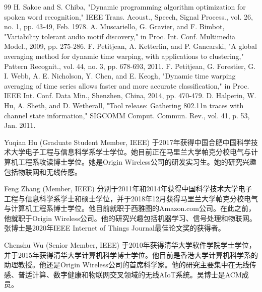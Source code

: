 \documentclass[journal]{IEEEtran}
\begin{document}
\begin{thebibliography}{99}
 H. Sakoe and S. Chiba, "Dynamic programming algorithm optimization for spoken word recognition," IEEE Trans. Acoust., Speech, Signal Process., vol. 26, no. 1, pp. 43-49, Feb. 1978.
 A. Muscariello, G. Gravier, and F. Bimbot, "Variability tolerant audio motif discovery," in Proc. Int. Conf. Multimedia Model., 2009, pp. 275-286.
 F. Petitjean, A. Ketterlin, and P. Gancarski, "A global averaging method for dynamic time warping, with applications to clustering," Pattern Recognit., vol. 44, no. 3, pp. 678-693, 2011.
 F. Petitjean, G. Forestier, G. I. Webb, A. E. Nicholson, Y. Chen, and E. Keogh, "Dynamic time warping averaging of time series allows faster and more accurate classification," in Proc. IEEE Int. Conf. Data Min., Shenzhen, China, 2014, pp. 470-479.
 D. Halperin, W. Hu, A. Sheth, and D. Wetherall, "Tool release: Gathering 802.11n traces with channel state information," SIGCOMM Comput. Commun. Rev., vol. 41, p. 53, Jan. 2011.
\end{thebibliography}

\begin{IEEEbiographynophoto}{Yuqian Hu} (Graduate Student Member, IEEE) 
于2017年获得中国合肥中国科学技术大学电子工程与信息科学系学士学位。她目前正在马里兰大学帕克分校电气与计算机工程系攻读博士学位。她是Origin Wireless公司的研发实习生。她的研究兴趣包括物联网和无线传感。
\end{IEEEbiographynophoto}

\begin{IEEEbiographynophoto}{Feng Zhang} (Member, IEEE) 
分别于2011年和2014年获得中国科学技术大学电子工程与信息科学系学士和硕士学位，并于2018年12月获得马里兰大学帕克分校电气与计算机工程系博士学位。他目前就职于西雅图的Amazon.com公司。在此之前，他就职于Origin Wireless公司。他的研究兴趣包括机器学习、信号处理和物联网。张博士是2020年IEEE Internet of Things Journal最佳论文奖的获得者。
\end{IEEEbiographynophoto}

\begin{IEEEbiographynophoto}{Chenshu Wu} (Senior Member, IEEE) 
于2010年获得清华大学软件学院学士学位，并于2015年获得清华大学计算机科学博士学位。他目前是香港大学计算机科学系的助理教授。他还是Origin Wireless公司的首席科学家。他的研究主要集中在无线传感、普适计算、数字健康和物联网交叉领域的无线AIoT系统。吴博士是ACM成员。
\end{IEEEbiographynophoto}
\end{document}
